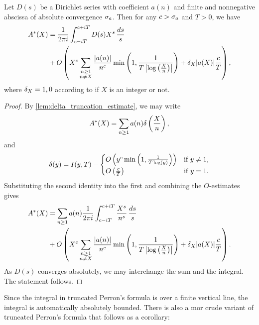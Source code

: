 \documentclass[12pt]{article}
\begin{document}
    \begin{theorem*}
      Let \(D(s)\) be a Dirichlet series with coefficient \(a(n)\) and finite and nonnegative abscissa of absolute convergence \(\sigma_{a}\). Then for any \(c > \sigma_{a}\) and \(T > 0\), we have
      \begin{align*}
        A^{\ast}(X) &= \frac{1}{2\pi i}\int_{c-iT}^{c+iT}D(s)X^{s}\,\frac{ds}{s} \\
        &+ O\left(X^{c}\sum_{\substack{n \ge 1 \\ n \neq X}}\frac{|a(n)|}{n^{c}}\min\left(1,\frac{1}{T\left|\log\left(\frac{X}{n}\right)\right|}\right)+\delta_{X}|a(X)|\frac{c}{T}\right),
      \end{align*}
      where \(\delta_{X} = 1,0\) according to if \(X\) is an integer or not.
    \end{theorem*}
    \begin{proof}
      By \cref{lem:delta_truncation_estimate}, we may write
      \[
        A^{\ast}(X) = \sum_{n \ge 1}a(n)\delta\left(\frac{X}{n}\right),
      \]
      and
      \[
        \delta(y) = I(y,T)-\begin{cases} O\left(y^{c}\min\left(1,\frac{1}{T\log(y)}\right)\right) & \text{if \(y \neq 1\)}, \\ O\left(\frac{c}{T}\right) & \text{if \(y = 1\)}. \end{cases}
      \] 
      Substituting the second identity into the first and combining the \(O\)-estimates gives
      \begin{align*}
        A^{\ast}(X) &= \sum_{n \ge 1}a(n)\frac{1}{2\pi i}\int_{c-iT}^{c+iT}\frac{X^{s}}{n^{s}}\,\frac{ds}{s} \\
        &+ O\left(X^{c}\sum_{\substack{n \ge 1 \\ n \neq X}}\frac{|a(n)|}{n^{c}}\min\left(1,\frac{1}{T\left|\log\left(\frac{X}{n}\right)\right|}\right)+\delta_{X}|a(X)|\frac{c}{T}\right).
      \end{align*}
      As \(D(s)\) converges absolutely, we may interchange the sum and the integral. The statement follows.
    \end{proof}

    Since the integral in truncated Perron's formula is over a finite vertical line, the integral is automatically absolutely bounded. There is also a mor crude variant of truncated Perron's formula that follows as a corollary:
\end{document}

